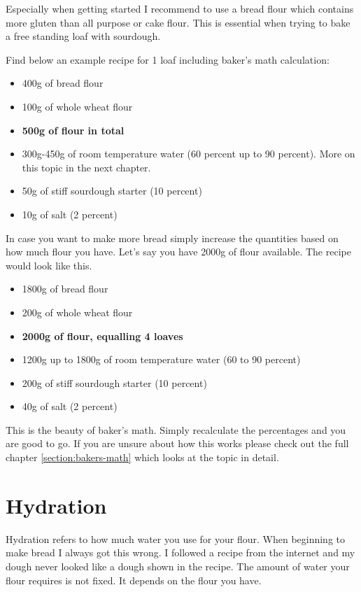 Especially when getting started I recommend to use a bread flour which
contains more gluten than all purpose or cake flour. This is essential
when trying to bake a free standing loaf with sourdough.

Find below an example recipe for 1 loaf including baker's math calculation:

\begin{itemize}
  \item 400g of bread flour
  \item 100g of whole wheat flour
  \item \textbf{500g of flour in total}
  \item 300g-450g of room temperature water (60 percent up to 90 percent). More on
this topic in the next chapter.
  \item 50g of stiff sourdough starter (10 percent)
  \item 10g of salt (2 percent)
\end{itemize}

In case you want to make more bread simply increase the quantities based on
how much flour you have. Let's say you have 2000g of flour available. The
recipe would look like this.

\begin{itemize}
  \item 1800g of bread flour
  \item 200g of whole wheat flour
  \item \textbf{2000g of flour, equalling 4 loaves}
  \item 1200g up to 1800g of room temperature water (60 to 90 percent)
  \item 200g of stiff sourdough starter (10 percent)
  \item 40g of salt (2 percent)
\end{itemize}

This is the beauty of baker's math. Simply recalculate the percentages and you
are good to go. If you are unsure about how this works please check out the
full chapter \ref{section:bakers-math} which looks at the topic in detail.


\section{Hydration}

Hydration refers to how much water you use for your flour. When
beginning to make bread I always got this wrong. I followed a recipe from the
internet and my dough never looked like a dough shown in the recipe.
The amount of water your flour requires is not fixed. It depends on the flour
you have.

